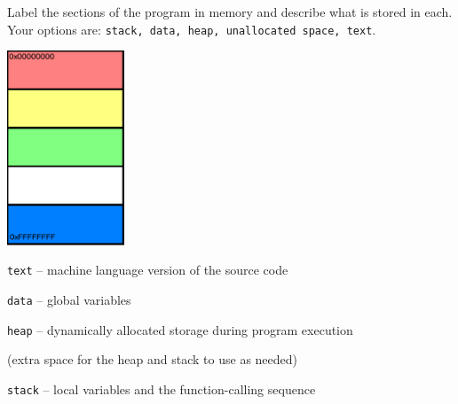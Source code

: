 Label the sections of the program in memory and describe what is stored in each. \\
Your options are: \texttt{stack, data, heap, unallocated space, text}.

\begin{minipage}{0.2\textwidth}
	\includegraphics[width=35mm]{other/programstructure.png}
\end{minipage}
\begin{minipage}{0.7\textwidth}
	\begin{answer}

	\texttt{text} -- machine language version of the source code

	\bigskip \medskip

	\texttt{data} -- global variables

	\bigskip \medskip

	\texttt{heap} -- dynamically allocated storage during program execution

	\bigskip \medskip

	(extra space for the heap and stack to use as needed)

	\bigskip \medskip

	\texttt{stack} -- local variables and the function-calling sequence

	\end{answer}
\end{minipage} \hfill




